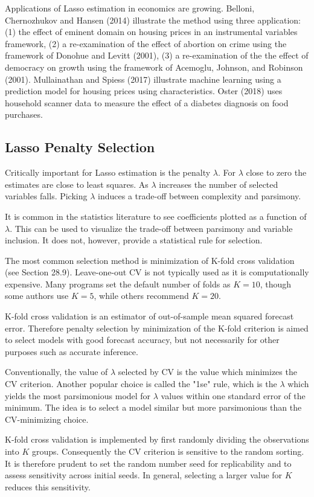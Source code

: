 \documentclass[10pt]{article}
\begin{document}
Applications of Lasso estimation in economics are growing. Belloni, Chernozhukov and Hansen (2014) illustrate the method using three application: (1) the effect of eminent domain on housing prices in an instrumental variables framework, (2) a re-examination of the effect of abortion on crime using the framework of Donohue and Levitt (2001), (3) a re-examination of the the effect of democracy on growth using the framework of Acemoglu, Johnson, and Robinson (2001). Mullainathan and Spiess (2017) illustrate machine learning using a prediction model for housing prices using characteristics. Oster (2018) uses household scanner data to measure the effect of a diabetes diagnosis on food purchases.

\subsection{Lasso Penalty Selection}
Critically important for Lasso estimation is the penalty $\lambda$. For $\lambda$ close to zero the estimates are close to least squares. As $\lambda$ increases the number of selected variables falls. Picking $\lambda$ induces a trade-off between complexity and parsimony.

It is common in the statistics literature to see coefficients plotted as a function of $\lambda$. This can be used to visualize the trade-off between parsimony and variable inclusion. It does not, however, provide a statistical rule for selection.

The most common selection method is minimization of K-fold cross validation (see Section 28.9). Leave-one-out CV is not typically used as it is computationally expensive. Many programs set the default number of folds as $K=10$, though some authors use $K=5$, while others recommend $K=20$.

K-fold cross validation is an estimator of out-of-sample mean squared forecast error. Therefore penalty selection by minimization of the K-fold criterion is aimed to select models with good forecast accuracy, but not necessarily for other purposes such as accurate inference.

Conventionally, the value of $\lambda$ selected by CV is the value which minimizes the CV criterion. Another popular choice is called the "1se" rule, which is the $\lambda$ which yields the most parsimonious model for $\lambda$ values within one standard error of the minimum. The idea is to select a model similar but more parsimonious than the CV-minimizing choice.

K-fold cross validation is implemented by first randomly dividing the observations into $K$ groups. Consequently the $\mathrm{CV}$ criterion is sensitive to the random sorting. It is therefore prudent to set the random number seed for replicability and to assess sensitivity across initial seeds. In general, selecting a larger value for $K$ reduces this sensitivity.
\end{document}
